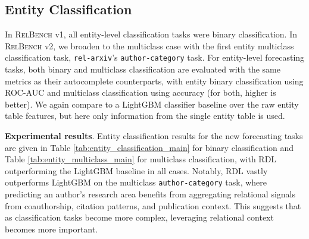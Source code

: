 \documentclass{article} %
\newcommand{\mr}[2]{\multirow{#1}{*}{#2}}
\newcommand{\mc}[3]{\multicolumn{#1}{#2}{#3}}
\newcommand{\relbench}{\textsc{RelBench}\xspace}
\newcommand{\salt}{\texttt{rel-salt}\xspace}
\newcommand{\arxiv}{\texttt{rel-arxiv}\xspace}
\newcommand{\itemIncoterms}{\texttt{item-incoterms}\xspace}
\begin{document}



\subsection{Entity Classification}

In \relbench v1, all entity-level classification tasks were binary classification. In \relbench v2, we broaden to the multiclass case with the first entity multiclass classification task, \arxiv's \texttt{author-category} task. For entity-level forecasting tasks, both binary and multiclass classification are evaluated with the same metrics as their autocomplete counterparts, with entity binary classification using ROC-AUC \citep{hanley1983method} and multiclass classification using accuracy (for both, higher is better). We again compare to a LightGBM classifier baseline over the raw entity table features, but here only information from the single entity table is used.

\textbf{Experimental results}. Entity classification results for the new forecasting tasks are given in Table \ref{tab:entity_classification_main} for binary classification and Table \ref{tab:entity_multiclass_main} for multiclass classification, with RDL outperforming the LightGBM baseline in all cases. Notably, RDL vastly outperforms LightGBM on the multiclass \texttt{author-category} task, where predicting an author’s research area benefits from aggregating relational signals from coauthorship, citation patterns, and publication context. This suggests that as classification tasks become more complex, leveraging relational context becomes more important.
\end{document}

